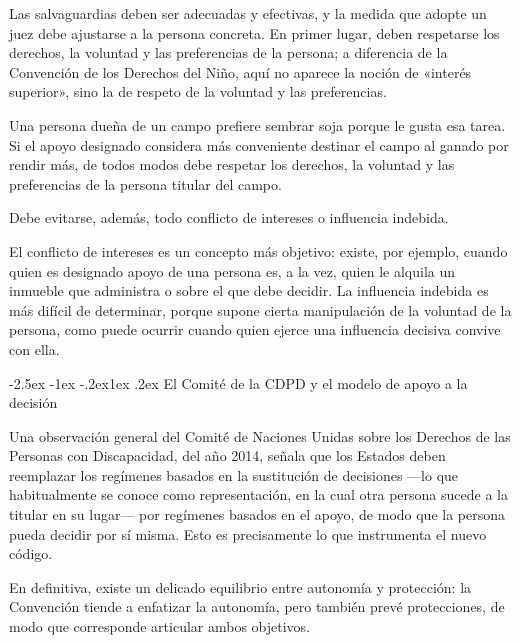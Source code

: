 \documentclass[12pt,oneside]{book}
\makeatletter
\renewcommand\subsection{\@startsection{subsection}{2}{\z@}%
  {-2.5ex \@plus -1ex \@minus -.2ex}{1ex \@plus .2ex}%
  {\normalfont\normalsize\bfseries}}
\makeatother
\begin{document}
Las salvaguardias deben ser adecuadas y efectivas, y la medida que adopte un juez debe ajustarse a la persona concreta. En primer lugar, deben respetarse los derechos, la voluntad y las preferencias de la persona; a diferencia de la Convención de los Derechos del Niño, aquí no aparece la noción de «interés superior», sino la de respeto de la voluntad y las preferencias.

\begin{ejemplo}
Una persona dueña de un campo prefiere sembrar soja porque le gusta esa tarea. Si el apoyo designado considera más conveniente destinar el campo al ganado por rendir más, de todos modos debe respetar los derechos, la voluntad y las preferencias de la persona titular del campo.
\end{ejemplo}

Debe evitarse, además, todo conflicto de intereses o influencia indebida.

\begin{definicion}
El conflicto de intereses es un concepto más objetivo: existe, por ejemplo, cuando quien es designado apoyo de una persona es, a la vez, quien le alquila un inmueble que administra o sobre el que debe decidir. La influencia indebida es más difícil de determinar, porque supone cierta manipulación de la voluntad de la persona, como puede ocurrir cuando quien ejerce una influencia decisiva convive con ella.
\end{definicion}

\subsection{El Comité de la CDPD y el modelo de apoyo a la decisión}

Una observación general del Comité de Naciones Unidas sobre los Derechos de las Personas con Discapacidad, del año 2014, señala que los Estados deben reemplazar los regímenes basados en la sustitución de decisiones ---lo que habitualmente se conoce como representación, en la cual otra persona sucede a la titular en su lugar--- por regímenes basados en el apoyo, de modo que la persona pueda decidir por sí misma. Esto es precisamente lo que instrumenta el nuevo código.

En definitiva, existe un delicado equilibrio entre autonomía y protección: la Convención tiende a enfatizar la autonomía, pero también prevé protecciones, de modo que corresponde articular ambos objetivos.
\end{document}

